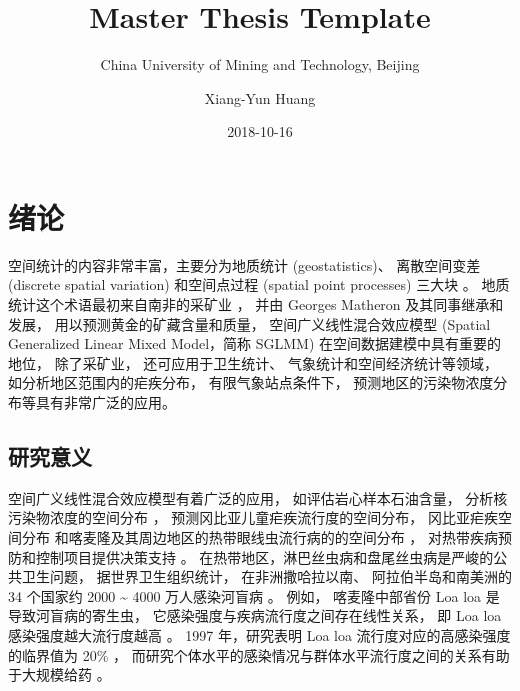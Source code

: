 \documentclass[12pt,a4paper,UTF8,twoside]{book}
\title{Master Thesis Template}
\subtitle{China University of Mining and Technology, Beijing}
\author{Xiang-Yun Huang}
\date{2018-10-16}
\theoremstyle{definition}
\theoremstyle{definition}
\theoremstyle{definition}
\theoremstyle{remark}
\begin{document}





{
\setcounter{tocdepth}{2}
\tableofcontents
}

\mainmatter

\hypertarget{intro}{%
\chapter{绪论}\label{intro}}

空间统计的内容非常丰富，主要分为地质统计 (geostatistics)、 离散空间变差
(discrete spatial variation) 和空间点过程 (spatial point processes)
三大块 \citep{Cressie1993}。 地质统计这个术语最初来自南非的采矿业
\citep{Krige1951}， 并由 Georges Matheron 及其同事继承和发展，
用以预测黄金的矿藏含量和质量， 空间广义线性混合效应模型 (Spatial
Generalized Linear Mixed Model，简称 SGLMM)
在空间数据建模中具有重要的地位， 除了采矿业， 还可应用于卫生统计、
气象统计和空间经济统计等领域， 如分析地区范围内的疟疾分布，
有限气象站点条件下， 预测地区的污染物浓度分布等具有非常广泛的应用。

\hypertarget{motivations}{%
\section{研究意义}\label{motivations}}

空间广义线性混合效应模型有着广泛的应用， 如评估岩心样本石油含量，
分析核污染物浓度的空间分布 \citep{Diggle1998}，
预测冈比亚儿童疟疾流行度的空间分布， 冈比亚疟疾空间分布
\citep{Thomson1999, Diggle2002Childhood}
和喀麦隆及其周边地区的热带眼线虫流行病的的空间分布
\citep{Diggle2007ATMP}， 对热带疾病预防和控制项目提供决策支持
\citep{Schl2016Using}。
在热带地区，淋巴丝虫病和盘尾丝虫病是严峻的公共卫生问题，
据世界卫生组织统计， 在非洲撒哈拉以南、 阿拉伯半岛和南美洲的 34 个国家约
2000 \textasciitilde{} 4000 万人感染河盲病 \citep{Takougang2002Rapid}。
例如， 喀麦隆中部省份 Loa loa 是导致河盲病的寄生虫，
它感染强度与疾病流行度之间存在线性关系， 即 Loa loa
感染强度越大流行度越高 \citep{Boussinesq2001}。 1997 年，研究表明 Loa
loa 流行度对应的高感染强度的临界值为 20\% \citep{Gardon1997Serious}，
而研究个体水平的感染情况与群体水平流行度之间的关系有助于大规模给药
\citep{Schl2016Using}。
\end{document}
